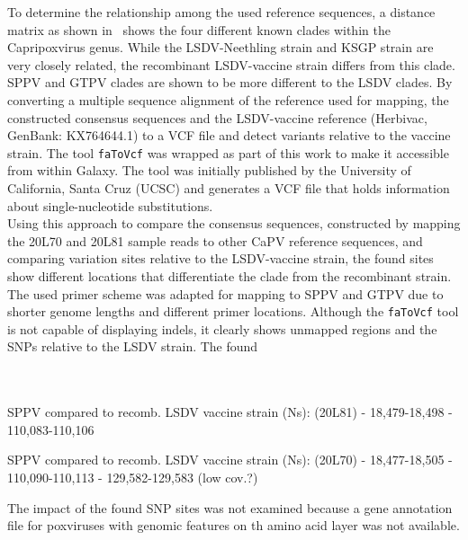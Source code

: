 To determine the relationship among the used reference sequences, a distance matrix as shown in~ shows the four different known clades within the Capripoxvirus genus. While the \ac{LSDV}-Neethling strain and KSGP strain are very closely related, the recombinant \ac{LSDV}-vaccine strain differs from this clade. \ac{SPPV} and \ac{GTPV} clades are shown to be more different to the \ac{LSDV} clades. By converting a multiple sequence alignment of the reference used for mapping, the constructed consensus sequences and the \ac{LSDV}-vaccine reference (Herbivac, GenBank: KX764644.1) to a \ac{VCF} file and detect variants relative to the vaccine strain. The tool \texttt{faToVcf} was wrapped as part of this work to make it accessible from within Galaxy. The tool was initially published by the University of California, Santa Cruz (UCSC) and generates a \ac{VCF} file that holds information about single-nucleotide substitutions.\\
Using this approach to compare the consensus sequences, constructed by mapping the 20L70 and 20L81 sample reads to other \ac{CaPV} reference sequences, and comparing variation sites relative to the \ac{LSDV}-vaccine strain, the found sites show different locations that differentiate the clade from the recombinant strain. The used primer scheme was adapted for mapping to \ac{SPPV} and \ac{GTPV} due to shorter genome lengths and different primer locations. Although the \texttt{faToVcf} tool is not capable of displaying indels, it clearly shows unmapped regions and the \acp{SNP} relative to the \ac{LSDV} strain. The found %

 \\
  \\
SPPV compared to recomb. LSDV vaccine strain (Ns): (20L81)
- 18,479-18,498
- 110,083-110,106

SPPV compared to recomb. LSDV vaccine strain (Ns): (20L70)
- 18,477-18,505
- 110,090-110,113
- 129,582-129,583 (low cov.?)

The impact of the found \ac{SNP} sites was not examined because a gene annotation file for poxviruses with genomic features on th amino acid layer was not available.


